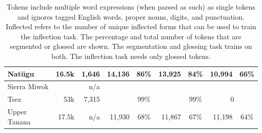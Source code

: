\begin{table}
\begin{tabular}{l|r|r|rc|rc|rc}
         \hline
         Natügu & 16.5k & 1,646 & 14,136 & 86\%  & 13,925 &  84\% & 10,994 & 66\% \\
         \hline
         Sierra Miwok &  & n/a &  &  &  &  &  \\
         \hline
         Tsez & 53k & 7,315 &  & 99\% &  & 99\% & \multicolumn{2}{c}{0}  \\
         \hline
         Upper Tanana & 17.5k & n/a & 11,930 & 68\% & 11,867 & 67\% & 11,198 & 64\% 
    \end{tabular}
    \caption[Data Statistics]{Tokens include multiple word expressions (when parsed as such) as single tokens and ignores tagged English words, proper nouns, digits, and punctuation. Inflected refers to the number of unique inflected forms that can be used to train the inflection task. The percentage and total number of tokens that are segmented or glossed are shown.  The segmentation and glossing task trains on both. The inflection task needs only glossed tokens.}
    \label{tab:dissdata}
\end{table}



